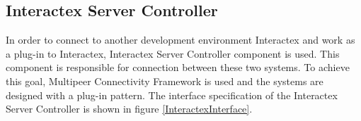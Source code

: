 
\subsection{Interactex Server Controller}
In order to connect to another development environment Interactex and work as a plug-in to Interactex, Interactex Server Controller component is used. This component is responsible for connection between these two systems. To achieve this goal, Multipeer Connectivity Framework is used and the systems are designed with a plug-in pattern. The interface specification of the Interactex Server Controller is shown in figure \ref{InteractexInterface}.\\

